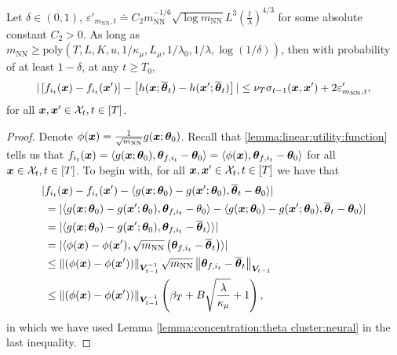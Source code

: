 \begin{lemma}
	\label{thm:confBound:neural}  
    Let $\delta\in(0,1)$, $\varepsilon'_{m_{\text{NN}},t} \doteq C_2 m_{\text{NN}}^{-1/6}\sqrt{\log m_{\text{NN}}} L^3 \left(\frac{t}{\lambda}\right)^{4/3}$ for some absolute constant $C_2>0$.
    As long as $m_{\text{NN}} \geq \text{poly}(T, L, K, u, 1/\kappa_\mu, L_\mu, 1/\lambda_0, 1/\lambda, \log(1/\delta))$, then with probability of at least $1-\delta$, at any $t\geq T_0$,
    \[
        |\left[f_{i_t}(\boldsymbol{x}) - f_{i_t}(\boldsymbol{x}')\right] - \left[h(\boldsymbol{x};\overline{\boldsymbol{\theta}}_t) - h(\boldsymbol{x}';\overline{\boldsymbol{\theta}}_t)\right]| \leq \nu_T \sigma_{t-1}(\boldsymbol{x}, \boldsymbol{x}') + 2\varepsilon'_{m_{\text{NN}},t},
    \]
    for all $\boldsymbol{x},\boldsymbol{x}'\in\mathcal{X}_t, t\in[T]$. 
\end{lemma}
\begin{proof}
	Denote $\phi(\boldsymbol{x}) = \frac{1}{\sqrt{m_{\text{NN}}}} g(\boldsymbol{x};\boldsymbol{\theta}_0)$.
	Recall that \cref{lemma:linear:utility:function} tells us that $f_{i_t}(\boldsymbol{x}) = \langle g(\boldsymbol{x};\boldsymbol{\theta}_0), \boldsymbol{\theta}_{f,i_t} - \boldsymbol{\theta}_0 \rangle=\langle \phi(\boldsymbol{x}), \boldsymbol{\theta}_{f,i_t} - \boldsymbol{\theta}_0 \rangle$ for all $\boldsymbol{x}\in\mathcal{X}_t,t\in[T]$.
	To begin with, for all $\boldsymbol{x},\boldsymbol{x}'\in\mathcal{X}_t,t\in[T]$ we have that
		\begin{equation}
		\begin{split}
			|&f_{i_t}(\boldsymbol{x}) - f_{i_t}(\boldsymbol{x}') - \langle g(\boldsymbol{x};\boldsymbol{\theta}_0) - g(\boldsymbol{x}';\boldsymbol{\theta}_0), \overline{\boldsymbol{\theta}}_t - \boldsymbol{\theta}_0 \rangle| \\
			&= |\langle g(\boldsymbol{x};\boldsymbol{\theta}_0) - g(\boldsymbol{x}';\boldsymbol{\theta}_0), \boldsymbol{\theta}_{f,i_t} - \theta_0 \rangle - \langle g(\boldsymbol{x};\boldsymbol{\theta}_0) - g(\boldsymbol{x}';\boldsymbol{\theta}_0), \overline{\boldsymbol{\theta}}_t - \boldsymbol{\theta}_0 \rangle|\\
			&= |\langle g(\boldsymbol{x};\boldsymbol{\theta}_0) - g(\boldsymbol{x}';\boldsymbol{\theta}_0), \boldsymbol{\theta}_{f,i_t} - \overline{\boldsymbol{\theta}}_t \rangle  \rangle|\\
			&= |\langle  \phi(\boldsymbol{x})-\phi(\boldsymbol{x}'), \sqrt{m_{\text{NN}}}\left( \boldsymbol{\theta}_{f,i_t} - \overline{\boldsymbol{\theta}}_t\right) \rangle  |\\
			&\leq \left\| \left(\phi(\boldsymbol{x})-\phi(\boldsymbol{x}')\right) \right\|_{\boldsymbol{V}_{t-1}^{-1}} \sqrt{m_{\text{NN}}}\left\| \boldsymbol{\theta}_{f,i_t} - \overline{\boldsymbol{\theta}}_t \right\|_{\boldsymbol{V}_{t-1}}\\
			&\leq \left\| \left(\phi(\boldsymbol{x})-\phi(\boldsymbol{x}')\right) \right\|_{\boldsymbol{V}_{t-1}^{-1}} \left( \beta_T + B \sqrt{\frac{\lambda}{\kappa_\mu}} + 1 \right),
		\end{split}
		\label{eq:diff:between:func:and:linear:approx:dueling}
		\end{equation}
	in which we have used Lemma \ref{lemma:concentration:theta cluster:neural} in the last inequality.

\end{proof}
